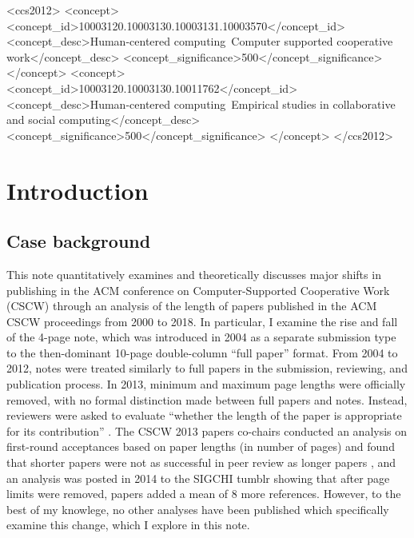 \documentclass[format=acmsmall, screen=true]{acmart}
\begin{document}
%
%
 \begin{CCSXML}
<ccs2012>
<concept>
<concept_id>10003120.10003130.10003131.10003570</concept_id>
<concept_desc>Human-centered computing~Computer supported cooperative work</concept_desc>
<concept_significance>500</concept_significance>
</concept>
<concept>
<concept_id>10003120.10003130.10011762</concept_id>
<concept_desc>Human-centered computing~Empirical studies in collaborative and social computing</concept_desc>
<concept_significance>500</concept_significance>
</concept>
</ccs2012>
\end{CCSXML}


%


\maketitle

\section{Introduction}
\subsection{Case background}
This note quantitatively examines and theoretically discusses major shifts in publishing in the ACM conference on Computer-Supported Cooperative Work (CSCW) through an analysis of the length of papers published in the ACM CSCW proceedings from 2000 to 2018. In particular, I examine the rise and fall of the 4-page note, which was introduced in 2004 as a separate submission type to the then-dominant 10-page double-column ``full paper'' format. From 2004 to 2012, notes were treated similarly to full papers in the submission, reviewing, and publication process. In 2013, minimum and maximum page lengths were officially removed, with no formal distinction made between full papers and notes. Instead, reviewers were asked to evaluate ``whether the length of the paper is appropriate for its contribution'' \cite{terveen_call_2013}. The CSCW 2013 papers co-chairs conducted an analysis on first-round acceptances based on paper lengths (in number of pages) and found that shorter papers were not as successful in peer review as longer papers \cite{terveen_process_2013}, and an analysis was posted in 2014 to the SIGCHI tumblr \cite{chi_tumblr} showing that after page limits were removed, papers added a mean of 8 more references. However, to the best of my knowlege, no other analyses have been published which specifically examine this change, which I explore in this note.
\end{document}
